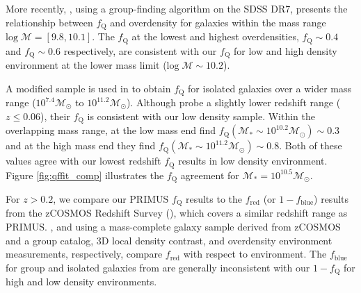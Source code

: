 \documentclass{emulateapj}
\begin{document}
More recently, \cite{Tinker:2011aa}, using a group-finding algorithm on the SDSS DR7, presents the relationship between $f_{\mathrm{Q}}$ and overdensity for galaxies within the mass range $\mathrm{log} \; \mathcal{M} = [9.8, 10.1]$. The \cite{Tinker:2011aa} $f_{\mathrm{Q}}$ at the lowest and highest overdensities, $f_{\mathrm{Q}} \sim 0.4$ and $f_{\mathrm{Q}} \sim 0.6$ respectively, are consistent with our $f_{\mathrm{Q}}$ for low and high density environment at the lower mass limit ($\mathrm{log} \; \mathcal{M} \sim 10.2$). 

A modified \cite{Tinker:2011aa} sample is used in \cite{geha12a} to
obtain $f_{\mathrm{Q}}$ for isolated galaxies over a wider mass range
($10^{7.4} \mathcal{M}_\odot$ to $10^{11.2}
\mathcal{M}_{\odot}$). Although \cite{geha12a} probe a slightly lower
redshift range ($ z \le 0.06$), their $f_{\mathrm{Q}}$ is consistent with
our low density sample. Within the overlapping mass range, at the low
mass end \cite{geha12a} find $f_{\mathrm{Q}}(\mathcal{M}_{*} \sim
10^{10.2} \mathcal{M}_{\odot}) \sim 0.3$ and at the high mass end they
find $f_{\mathrm{Q}}(\mathcal{M}_{*} \sim 10^{11.2} \mathcal{M}_{\odot})
\sim 0.8$. Both of these values agree with our lowest redshift
$f_{\mathrm{Q}}$ results in low density environment. Figure
\ref{fig:qffit_comp} illustrates the $f_{\mathrm{Q}}$ agreement for
$\mathcal{M}_{*} = 10^{10.5} \mathcal{M}_{\odot}$.


For $z > 0.2$, we compare our PRIMUS $f_{\mathrm{Q}}$ results to the $f_{\mathrm{red}}$ (or $1-f_{\mathrm{blue}}$) results from the zCOSMOS Redshift Survey (\citealt{Iovino:2010aa, Kovac:2014aa}), which covers a similar redshift range as PRIMUS. \cite{Iovino:2010aa}, and \cite{Kovac:2014aa} using a mass-complete galaxy sample derived from zCOSMOS and a group catalog, 3D local density contrast, and overdensity environment measurements, respectively, compare $f_{\mathrm{red}}$ with respect to environment. The $f_{\mathrm{blue}}$ for group and isolated galaxies from \cite{Iovino:2010aa} are generally inconsistent with our $1-f_{\mathrm{Q}}$ for high and low density environments. 
\end{document}
